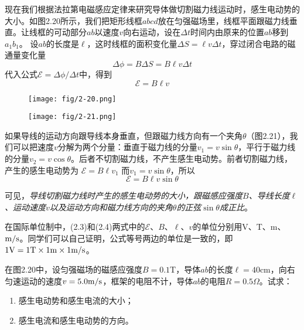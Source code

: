 现在我们根据法拉第电磁感应定律来研究导体做切割磁力线运动时，感生电动势的大小。如图2.20所示，我们把矩形线框$abcd$放在匀强磁场里，线框平面跟磁力线垂直。让线框的可动部分$ab$以速度$v$向右运动，设在$\Delta t$时间内由原来的位置$ab$移到$a_1b_1$。 设$ab$的长度是$\ell$，这时线框的面积变化量$\Delta S=\ell v\Delta t$，穿过闭合电路的磁通量变化量
\[\Delta \phi=B\Delta S=B\ell v\Delta t\]
代入公式$\mathcal{E}=\Delta \phi/\Delta t$中，得到
\begin{equation}
    \mathcal{E}=B\ell v
\end{equation}
\begin{figure}[htp]
\centering
\begin{minipage}[t]{0.48\textwidth}
\centering
\texttt{[image: fig/2-20.png]}
\caption{}
\end{minipage}
\begin{minipage}[t]{0.48\textwidth}
\centering
\texttt{[image: fig/2-21.png]}
\caption{}
\end{minipage}
\end{figure}

如果导线的运动方向跟导线本身垂直，但跟磁力线方向有一个夹角$\theta$（图2.21），我们可以把速度$v$分解为两个分量：垂直于磁力线的分量$v_1=v\sin\theta$，平行于磁力线的分量$v_2=v\cos\theta$。后者不切割磁力线，不产生感生电动势。前者切割磁力线，产生的感生电动势为
$\mathcal{E}=B\ell v_1$
而$v_1=v\sin\theta$，所以
\begin{equation}
    \mathcal{E}=B\ell v\sin\theta
\end{equation}

可见，\textit{导线切割磁力线时产生的感生电动势的大小，跟磁感应强度$B$、导线长度$\ell$、运动速度$v$以及运动方向和磁力线方向的夹角$\theta$的正弦$\sin\theta$成正比}。

在国际单位制中，(2.3)和(2.4)两式中的$\mathcal{E}$、$B$、$\ell$、$v$的单位分别用V、T、m、$\text{m}/\text{s}$。同学们可以自己证明，公式等号两边的单位是一致的，即$1{\rm V}=1{\rm T}\times1{\rm m}\times1\text{m}/\text{s}$。

\begin{example}
    在图2.20中，设匀强磁场的磁感应强度$B=0.1$T，导体$ab$的长度$\ell=40$cm，向右匀速运动的速度$v=5.0\text{m}/\text{s}$，框架的电阻不计，导体$ab$的电阻$R=0.5\Omega$。试求：
    \begin{enumerate}
        \item 感生电动势和感生电流的大小；
        \item 感生电流和感生电动势的方向。
    \end{enumerate}
\end{example}

